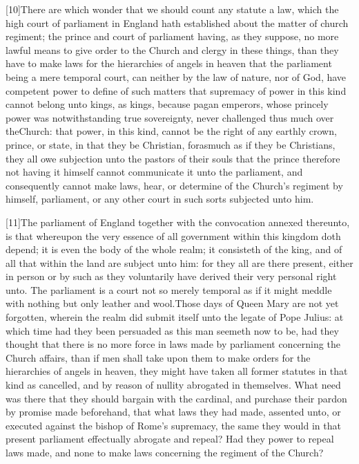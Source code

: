 [10]There are which wonder that we should count any statute a law, which the high court of parliament in England hath established about the matter of church regiment; the prince and court of parliament having, as they suppose, no more lawful means to give order to the Church and clergy in these things, than they have to make laws for the hierarchies of angels in heaven that the parliament being a mere temporal court, can neither by the law of nature, nor of God,  have competent power to define of such matters that supremacy of power in this kind cannot belong unto kings, as kings, because pagan emperors, whose princely power was notwithstanding true sovereignty, never challenged thus much over theChurch: that power, in this kind, cannot be the right of any earthly crown, prince, or state, in that they be Christian, forasmuch as if they be Christians, they all owe subjection unto the pastors of their souls that the prince therefore not having it himself cannot communicate it unto the parliament, and consequently cannot make laws, hear, or determine of the Church’s regiment by himself, parliament, or any other court in such sorts subjected unto him.

[11]The parliament of England together with the convocation annexed thereunto, is that whereupon the very essence of all government within this kingdom doth depend; it is even the body of the whole realm; it consisteth of the king, and of all that within the land are subject unto him: for they all are there present, either in person or by such as they  voluntarily have derived their very personal right unto. The parliament is a court not so merely temporal as if it might meddle with nothing but only leather and wool.Those days of Queen Mary are not yet forgotten, wherein the realm did submit itself unto the legate of Pope Julius: at which time had they been persuaded as this man seemeth now to be, had they thought that there is no more force in laws made by parliament concerning the Church affairs, than if men shall take upon them to make orders for the hierarchies of angels in heaven, they might have taken all former statutes in that kind as cancelled, and by reason of nullity abrogated in themselves. What need was there that they should bargain with the cardinal, and purchase their pardon by promise made beforehand, that what laws they had made, assented unto, or executed against the bishop of Rome’s supremacy, the same they would in that present parliament effectually abrogate and repeal? Had they power to repeal laws made, and none to make laws concerning the regiment of the Church?

